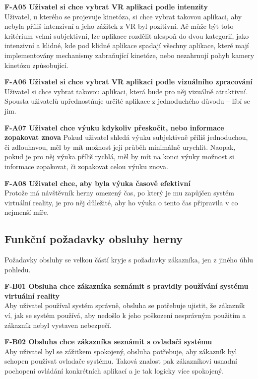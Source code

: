 \textbf{F-A05 Uživatel si chce vybrat VR aplikaci podle intenzity}\\
Uživatel, u kterého se projevuje kinetóza, si chce vybrat takovou
aplikaci, aby nebyla příliš intenzivní a jeho zážitek z VR byl
pozitivní. Ač může být toto kritérium velmi subjektivní, lze aplikace
rozdělit alespoň do dvou kategorií, jako intenzivní a klidné, kde pod
klidné aplikace spadají všechny aplikace, které mají implementovány
mechanismy zabraňující kinetóze, nebo nezahrnují pohyb kamery kinetózu
způsobující.

\textbf{F-A06 Uživatel si chce vybrat VR aplikaci podle vizuálního
zpracování}\\
Uživatel si chce vybrat takovou aplikaci, která bude pro něj vizuálně
atraktivní. Spousta uživatelů upřednostňuje určité aplikace z
jednoduchého důvodu -- líbí se jim.

\textbf{F-A07 Uživatel chce výuku kdykoliv přeskočit, nebo informace
zopakovat znova} Pokud uživatel shledá výuku subjektivně příliš
jednoduchou, či zdlouhavou, měl by mít možnost její průběh minimálně
urychlit. Naopak, pokud je pro něj výuka příliš rychlá, měl by mít na
konci výuky možnost si informace zopakovat, či zopakovat celou výuku
znova.

\textbf{F-A08 Uživatel chce, aby byla výuka časově efektivní}\\
Protože má návštěvník herny omezený čas, po který je mu zapůjčen systém
virtuální reality, je pro něj důležité, aby ho výuka o tento čas
připravila v co nejmenší míře.

\subsection{Funkční požadavky obsluhy
herny}\label{funkux10dnuxed-poux17eadavky-obsluhy-herny}

Požadavky obsluhy se velkou částí kryje s požadavky zákazníka, jen z
jiného úhlu pohledu.

\textbf{F-B01 Obsluha chce zákazníka seznámit s pravidly používání
systému virtuální reality}\\
Aby uživatel používal systém správně, obsluha se potřebuje ujistit, že
zákazník ví, jak se systém používá, aby nedošlo k jeho poškození
nesprávným použitím a zákazník nebyl vystaven nebezpečí.

\textbf{F-B02 Obsluha chce zákazníka seznámit s ovladači systému}\\
Aby uživatel byl se zážitkem spokojený, obsluha potřebuje, aby zákazník
byl schopen používat ovladače systému. Taková znalost pak zákazníkovi
usnadní pochopení ovládání konkrétních aplikací a je tak logicky více
spokojený.

